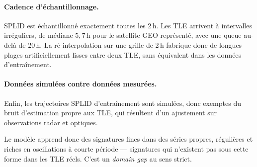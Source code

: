 \documentclass{article}
\begin{document}
\paragraph{Cadence d'échantillonnage.} SPLID est échantillonné exactement toutes les 2\,h. Les TLE arrivent à intervalles irréguliers, de médiane $5{,}7$\,h pour le satellite GEO représenté, avec une queue au-delà de 20\,h. La ré-interpolation sur une grille de 2\,h fabrique donc de longues plages artificiellement lisses entre deux TLE, sans équivalent dans les données d'entraînement.

\paragraph{Données simulées contre données mesurées.} Enfin, les trajectoires SPLID d'entraînement sont simulées, donc exemptes du bruit d'estimation propre aux TLE, qui résultent d'un ajustement sur observations radar et optiques.

Le modèle apprend donc des signatures fines dans des séries propres, régulières et riches en oscillations à courte période — signatures qui n'existent pas sous cette forme dans les TLE réels. C'est un \textit{domain gap} au sens strict.
\end{document}
